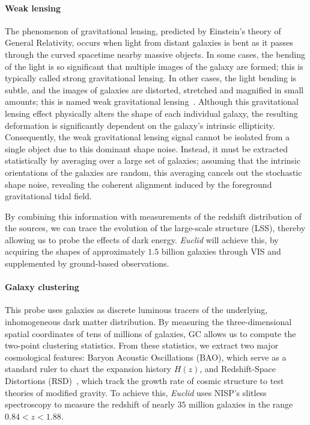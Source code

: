 \documentclass[12pt,a4paper,oneside]{report}
\begin{document}
\paragraph{Weak lensing}\label{parag:WeakLensing}
The phenomenon of gravitational lensing, predicted by Einstein’s theory of General Relativity, occurs when light from distant galaxies is bent as it passes through the curved spacetime nearby massive objects. In some cases, the bending of the light is so significant that multiple images of the galaxy are formed; this is typically called strong gravitational lensing. In other cases, the light bending is subtle, and the images of galaxies are distorted, stretched and magnified in small amounts; this is named weak gravitational lensing~\cite{WeakLensing}. Although this gravitational lensing effect physically alters the shape of each individual galaxy, the resulting deformation is significantly dependent on the galaxy’s intrinsic ellipticity. Consequently, the weak gravitational lensing signal cannot be isolated from a single object due to this dominant shape noise. Instead, it must be extracted statistically by averaging over a large set of galaxies; assuming that the intrinsic orientations of the galaxies are random, this averaging cancels out the stochastic shape noise, revealing the coherent alignment induced by the foreground gravitational tidal field.

By combining this information with measurements of the redshift distribution of the sources, we can trace the evolution of the large-scale structure (LSS), thereby allowing us to probe the effects of dark energy. \textit{Euclid} will achieve this, by acquiring the shapes of approximately $1.5$ billion galaxies through VIS and supplemented by ground-based observations.

\paragraph{Galaxy clustering}\label{parag:GalaxyClustering}
This probe uses galaxies as discrete luminous tracers of the underlying, inhomogeneous dark matter distribution. By measuring the three-dimensional spatial coordinates of tens of millions of galaxies, GC allows us to compute the two-point clustering statistics. From these statistics, we extract two major cosmological features: Baryon Acoustic Oscillations (BAO), which serve as a standard ruler to chart the expansion history $H(z)$, and Redshift-Space Distortions (RSD)~\cite{EisensteinBAO}, which track the growth rate of cosmic structure to test theories of modified gravity. To achieve this, \textit{Euclid} uses NISP’s slitless spectroscopy to measure the redshift of nearly $35$ million galaxies in the range $0.84 < z < 1.88$.
\end{document}
